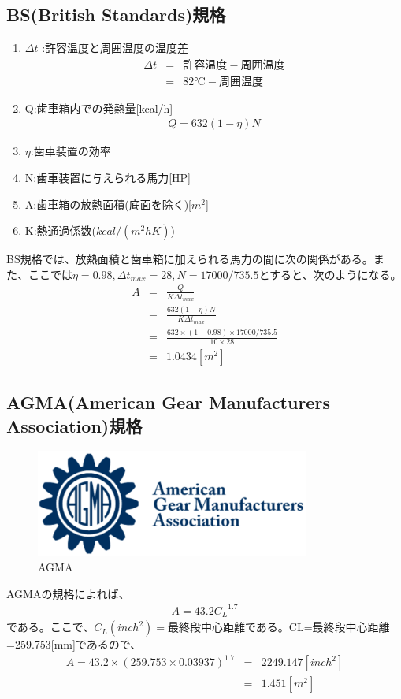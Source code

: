 \subsection{BS(British Standards)規格}
\begin{enumerate}
\item $\Delta t$ :許容温度と周囲温度の温度差
\begin{eqnarray}
\Delta t &=&  許容温度 - 周囲温度\\
         &=&  82℃ - 周囲温度
\end{eqnarray}
\item Q:歯車箱内での発熱量[kcal/h]
\begin{eqnarray}
Q=632(1-\eta)N
\end{eqnarray}
\item $\eta$:歯車装置の効率
\item N:歯車装置に与えられる馬力[HP]
\item A:歯車箱の放熱面積(底面を除く)[$m^2$]
\item K:熱通過係数($kcal/(m^2hK)$)
\end{enumerate}
BS規格では、放熱面積と歯車箱に加えられる馬力の間に次の関係がある。また、ここでは$\eta=0.98,\Delta t_{max} = 28,N=17000/735.5$とすると、次のようになる。
\begin{eqnarray}
A&=&\frac{Q}{K\Delta t_{max}}\\
 &=&\frac{632(1-\eta)N}{K\Delta t_{max}}\\
 &=&\frac{632\times(1-0.98) \times 17000/735.5}{10 \times 28}\\
 &=&1.0434[m^2]
\end{eqnarray}
\subsection{AGMA(American Gear Manufacturers Association)規格}
\begin{figure}[htbp]
  \begin{center}
\includegraphics[width=9cm]{../picture/20127161210319005.eps}
\end{center}
\caption{AGMA}
\end{figure}
AGMAの規格によれば、
\begin{eqnarray}
A=43.2{C_L}^{1.7}
\end{eqnarray}
である。ここで、$C_L(inch^2)=最終段中心距離$である。CL=最終段中心距離=259.753[mm]であるので、
\begin{eqnarray}
A=43.2 \times (259.753 \times 0.03937)^{1.7} &=& 2249.147 [inch^2]\\
&=&1.451[m^2]
\end{eqnarray}

